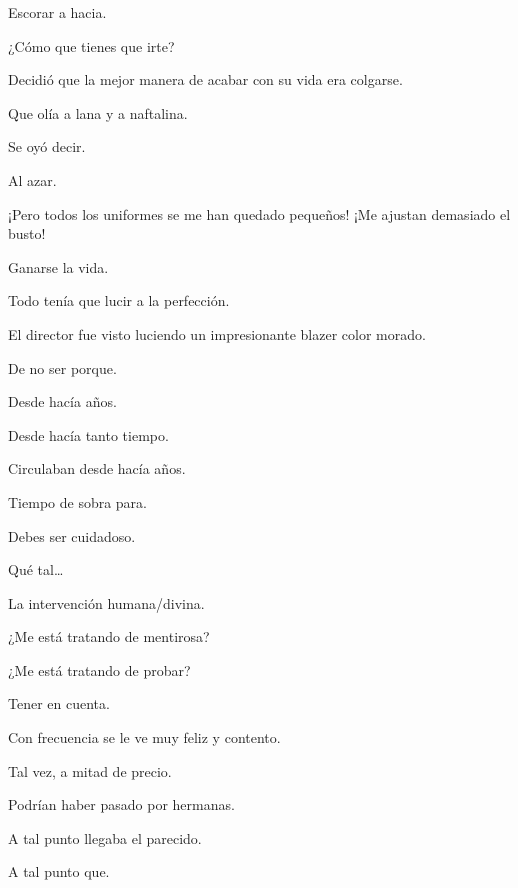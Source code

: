 \sk
Escorar a hacia. 

\sk
¿Cómo que tienes que irte? 

\sk
Decidió que la mejor manera de acabar con su vida era colgarse. \nb{}

\sk
Que olía a lana y a naftalina. 

\sk
Se oyó decir. 

\sk
Al azar. 

\sk
¡Pero todos los uniformes se me han quedado pequeños! ¡Me ajustan demasiado el busto!\nb{}

\sk
Ganarse la vida. 

\sk
Todo tenía que lucir a la perfección. \nb{}

\sk
El director fue visto luciendo un impresionante blazer color morado. 

\sk
De no ser porque. 

\sk
Desde hacía años. 

\sk
Desde hacía tanto tiempo. 

\sk
Circulaban desde hacía años. 

\sk
Tiempo de sobra para. 

\sk
Debes ser cuidadoso. 

\sk
Qué tal\ldots{} 

\sk
La intervención humana/divina.\nb{}

\sk
¿Me está tratando de mentirosa? 

\sk
¿Me está tratando de probar? 

\sk
Tener en cuenta. 

\sk
Con frecuencia se le ve muy feliz y contento. 

\sk
Tal vez, a mitad de precio. 

\sk
Podrían haber pasado por hermanas. 

\sk
A tal punto llegaba el parecido. 

\sk
A tal punto que. 

